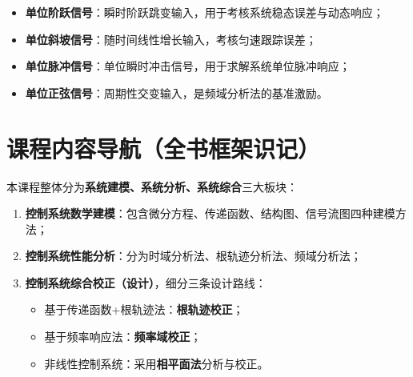 \begin{itemize}
    \item \textbf{单位阶跃信号}：瞬时阶跃跳变输入，用于考核系统稳态误差与动态响应；
    \item \textbf{单位斜坡信号}：随时间线性增长输入，考核匀速跟踪误差；
    \item \textbf{单位脉冲信号}：单位瞬时冲击信号，用于求解系统单位脉冲响应；
    \item \textbf{单位正弦信号}：周期性交变输入，是频域分析法的基准激励。
\end{itemize}

\section{课程内容导航（全书框架识记）}
本课程整体分为\textbf{系统建模、系统分析、系统综合}三大板块：
\begin{enumerate}
    \item \textbf{控制系统数学建模}：包含微分方程、传递函数、结构图、信号流图四种建模方法；
    \item \textbf{控制系统性能分析}：分为时域分析法、根轨迹分析法、频域分析法；
    \item \textbf{控制系统综合校正（设计）}，细分三条设计路线：
    \begin{itemize}
        \item 基于传递函数+根轨迹法：\textbf{根轨迹校正}；
        \item 基于频率响应法：\textbf{频率域校正}；
        \item 非线性控制系统：采用\textbf{相平面法}分析与校正。
    \end{itemize}
\end{enumerate}

\setlength{\parskip}{0pt plus 1pt}
\renewcommand{\arraystretch}{1}
\setlength{\tabcolsep}{6pt}
